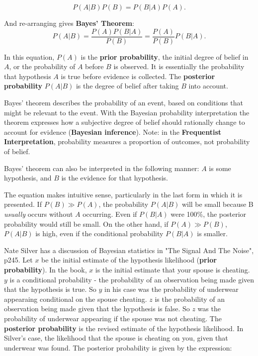 \begin{equation}
P(A|B)P(B) = P(B|A)P(A).
\end{equation}

And re-arranging gives \textbf{Bayes' Theorem}:
\begin{equation}
P(A|B) = \frac{P(A)P(B|A)}{P(B)} = \frac{P(A)}{P(B)} P(B|A).
\label{equation:simpleBayes}
\end{equation}

In this equation, $P(A)$ is the \textbf{prior probability}, the initial degree of belief in $A$, or the probability of $A$ before $B$ is observed. It is essentially the probability that hypothesis $A$ is true before evidence is collected. The \textbf{posterior probability} $P(A|B)$ is the degree of belief after taking $B$ into account. 

Bayes' theorem describes the probability of an event, based on conditions that might be relevant to the event. With the Bayesian probability interpretation the theorem expresses how a subjective degree of belief should rationally change to account for evidence (\textbf{Bayesian inference}). Note: in the \textbf{Frequentist Interpretation}, probability measures a proportion of outcomes, not probability of belief. 

Bayes' theorem can also be interpreted in the following manner: $A$ is some hypothesis, and $B$ is the evidence for that hypothesis. 

The equation makes intuitive sense, particularly in the last form in which it is presented. If $P(B) \gg P(A)$,  the probability $P(A|B)$ will be small because B \textit{usually} occurs without $A$ occurring. Even if $P(B|A)$ were 100\%, the posterior probability would still be small. On the other hand, if $P(A) \gg P(B)$, $P(A|B)$ is high, even if the conditional probability $P(B|A)$ is smaller. 

Nate Silver has a discussion of Bayesian statistics in "The Signal And The Noise", p245. Let $x$ be the initial estimate of the hypothesis likelihood (\textbf{prior probability}). In the book, $x$ is the initial estimate that your spouse is cheating. $y$ is a conditional probability - the probability of an observation being made given that the hypothesis is true. So $y$ in his case was the probability of underwear appearaing conditional on the spouse cheating. $z$ is the probability of an observation being made given that the hypothesis is false. So $z$ was the probability of underwear appearing if the spouse was not cheating. The \textbf{posterior probability} is the revised estimate of the hypothesis likelihood. In Silver's case, the likelihood that the spouse is cheating on you, given that underwear was found. The posterior probability is given by the expression:


